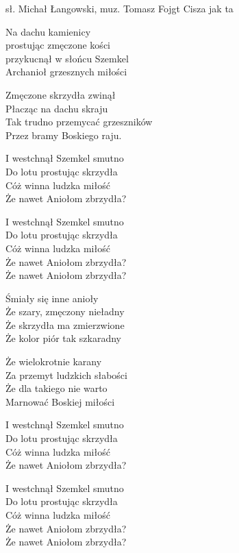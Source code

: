 {sł. Michał Łangowski, muz. Tomasz Fojgt}
{Cisza jak ta}
\begin{text}
\hfill\break
\hfill\break
\ifOneCol \else \hfill\break \fi
Na dachu kamienicy\\
prostując zmęczone kości\\
przykucnął w słońcu Szemkel\\
Archanioł grzesznych miłości

Zmęczone skrzydła zwinął\\
Płacząc na dachu skraju\\
Tak trudno przemycać grzeszników\\
Przez bramy Boskiego raju.

\vin I westchnął Szemkel smutno\\
\vin Do lotu prostując skrzydła\\
\vin Cóż winna ludzka miłość\\
\vin Że nawet Aniołom zbrzydła?

\vin I westchnął Szemkel smutno\\
\vin Do lotu prostując skrzydła\\
\vin Cóż winna ludzka miłość\\
\vin Że nawet Aniołom zbrzydła?\\
\vin Że nawet Aniołom zbrzydła?

\hfill\break
\ifOneCol \else \hfill\break \fi
Śmiały się inne anioły\\
Że szary, zmęczony nieładny\\
Że skrzydła ma zmierzwione\\
Że kolor piór tak szkaradny

Że wielokrotnie karany\\
Za przemyt ludzkich słabości\\
Że dla takiego nie warto\\
Marnować Boskiej miłości

\vin I westchnął Szemkel smutno\\
\vin Do lotu prostując skrzydła\\
\vin Cóż winna ludzka miłość\\
\vin Że nawet Aniołom zbrzydła?

\vin I westchnął Szemkel smutno\\
\vin Do lotu prostując skrzydła\\
\vin Cóż winna ludzka miłość\\
\vin Że nawet Aniołom zbrzydła?\\
\vin Że nawet Aniołom zbrzydła?


\end{text}
